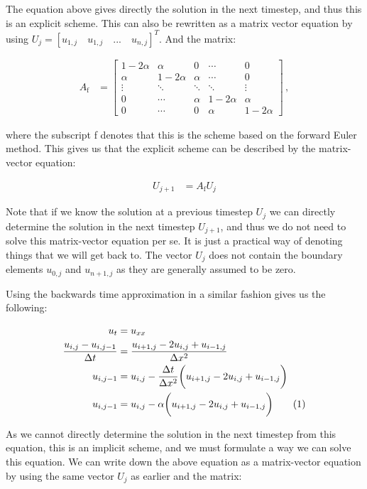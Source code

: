 \documentclass[reprint,english,notitlepage]{revtex4-1}  %
\newcommand\numberthis{\addtocounter{equation}{1}\tag{\theequation}}
\begin{document}
The equation above gives directly the solution in the next timestep, and thus this is an explicit scheme. This can also be rewritten as a matrix vector equation by using $U_j = [u_{1,j} \quad u_{1,j} \quad ... \quad u_{n,j} ] ^T$. And the matrix:

\begin{align*}
A_\text{f} &= \begin{bmatrix}
1 - 2\alpha & \alpha & 0   &\cdots & 0 \\
\alpha & 1-2\alpha & \alpha   & \cdots & 0 \\
\vdots & \ddots & \ddots & \ddots  & \vdots \\
0 & \cdots  & \alpha & 1 - 2\alpha & \alpha \\
0 & \cdots & 0 & \alpha & 1 - 2\alpha 
\end{bmatrix} \, ,
\end{align*}

where the subscript f denotes that this is the scheme based on the forward Euler method. This gives us that the explicit scheme can be described by the matrix-vector equation:

\begin{align*}
U_{j+1} &= A_\text{f} U_{j}
\end{align*}

Note that if we know the solution at a previous timestep $U_j$ we can directly determine the solution in the next timestep $U_{j+1}$, and thus we do not need to solve this matrix-vector equation per se. It is just a practical way of denoting things that we will get back to. The vector $U_j$ does not contain the boundary elements $u_{0,j}$ and $u_{n+1,j}$ as they are generally assumed to be zero.

Using the backwards time approximation in a similar fashion gives us the following: 

\begin{align*}
u_t &= u_{xx} \\ 
\frac{u_{i,j} - u_{i,j-1}}{\Delta t} &= \frac{u_{i+1,j} - 2u_{i,j} + u_{i-1,j}}{\Delta x^2} \\
u_{i,j-1} &= u_{i,j} - \frac{\Delta t}{\Delta x^2} \bigg( u_{i+1,j} - 2u_{i,j} + u_{i-1,j} \bigg) \\
u_{i,j-1} &= u_{i,j} - \alpha \bigg( u_{i+1,j} - 2u_{i,j} + u_{i-1,j} \bigg) \numberthis \label{eq:backward_euler_method}
\end{align*}

As we cannot directly determine the solution in the next timestep from this equation, this is an implicit scheme, and we must formulate a way we can solve this equation. We can write down the above equation as a matrix-vector equation by using the same vector $U_j$ as earlier and the matrix:
\end{document}
